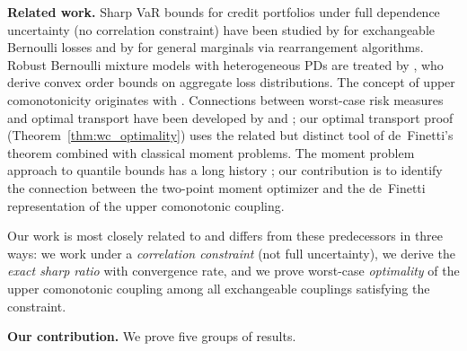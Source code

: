 \documentclass[11pt]{article}
\theoremstyle{definition}
\newcommand{\1}{\mathbf{1}}
\begin{document}
\medskip

\noindent\textbf{Related work.} Sharp VaR bounds for credit portfolios under full dependence uncertainty (no correlation constraint) have been studied by \citet{FontanaEtAl2021} for exchangeable Bernoulli losses and by \citet{EmbrechtsEtAl2013, EmbrechtsEtAl2006} for general marginals via rearrangement algorithms. Robust Bernoulli mixture models with heterogeneous PDs are treated by \citet{AnsariLutkebohmert2025}, who derive convex order bounds on aggregate loss distributions. The concept of upper comonotonicity originates with \citet{Cheung2009}. Connections between worst-case risk measures and optimal transport have been developed by \citet{BeiglbockJuillet2016} and \citet{EmbrechtsEtAl2013}; our optimal transport proof (Theorem~\ref{thm:wc_optimality}) uses the related but distinct tool of de~Finetti's theorem combined with classical moment problems. The moment problem approach to quantile bounds has a long history \citep{Karlin1966, Bertsimas2005}; our contribution is to identify the connection between the two-point moment optimizer and the de~Finetti representation of the upper comonotonic coupling.

Our work is most closely related to \citet{DVNSupper} and differs from these predecessors in three ways: we work under a \emph{correlation constraint} (not full uncertainty), we derive the \emph{exact sharp ratio} with convergence rate, and we prove worst-case \emph{optimality} of the upper comonotonic coupling among all exchangeable couplings satisfying the constraint.

\medskip

\noindent\textbf{Our contribution.} We prove five groups of results.
\end{document}
